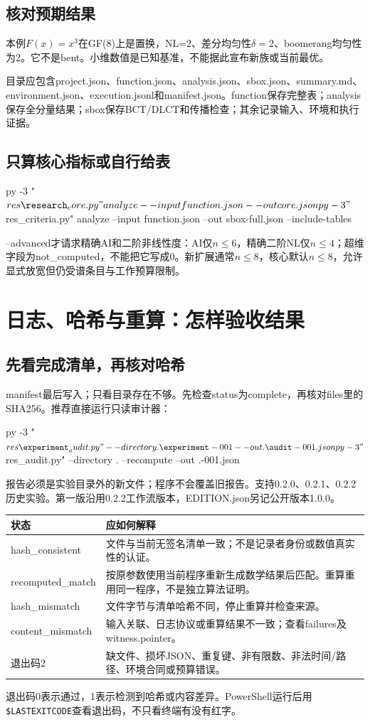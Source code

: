 \documentclass[UTF8,fontset=fandol,zihao=-4]{ctexrep}
\begin{document}
\section{核对预期结果}
本例$F(x)=x^3$在GF(8)上是置换，NL=2、差分均匀性$\delta=2$、boomerang均匀性为2。它不是bent。小维数值是已知基准，不能据此宣布新族或当前最优。

目录应包含project.json、function.json、analysis.json、sbox.json、summary.md、environment.json、execution.jsonl和manifest.json。function保存完整表；analysis保存全分量结果；sbox保存BCT/DLCT和传播检查；其余记录输入、环境和执行证据。

\section{只算核心指标或自行给表}
\begin{code}
py -3 "$res\research_core.py" analyze --input function.json --out core.json
py -3 "$res\sbox_criteria.py" analyze --input function.json --out sbox-full.json --include-tables
\end{code}
--advanced才请求精确AI和二阶非线性度：AI仅$n\le6$，精确二阶NL仅$n\le4$；超维字段为not\_computed，不能把它写成0。新扩展通常$n\le8$，核心默认$n\le8$，允许显式放宽但仍受谱条目与工作预算限制。

\chapter{日志、哈希与重算：怎样验收结果}
\section{先看完成清单，再核对哈希}
manifest最后写入；只看目录存在不够。先检查status为complete，再核对files里的SHA256。推荐直接运行只读审计器：
\begin{code}
py -3 "$res\experiment_audit.py" --directory .\experiment-001 --out .\audit-001.json
py -3 "$res\experiment_audit.py" --directory . --recompute --out .\replay-001.json
\end{code}
报告必须是实验目录外的新文件；程序不会覆盖旧报告。支持0.2.0、0.2.1、0.2.2历史实验。第一版沿用0.2.2工作流版本，EDITION.json另记公开版本1.0.0。

\begin{longtable}{p{40mm}p{105mm}}
\toprule 状态 & 应如何解释\\\midrule\endhead
hash\_consistent & 文件与当前无签名清单一致；不是记录者身份或数值真实性的认证。\\
recomputed\_match & 按原参数使用当前程序重新生成数学结果后匹配。重算重用同一程序，不是独立算法证明。\\
hash\_mismatch & 文件字节与清单哈希不同，停止重算并检查来源。\\
content\_mismatch & 输入关联、日志协议或重算结果不一致；查看failures及witness.pointer。\\
退出码2 & 缺文件、损坏JSON、重复键、非有限数、非法时间/路径、环境合同或预算错误。\\\bottomrule
\end{longtable}
退出码0表示通过，1表示检测到哈希或内容差异。PowerShell运行后用\texttt{\$LASTEXITCODE}查看退出码，不只看终端有没有红字。
\end{document}

